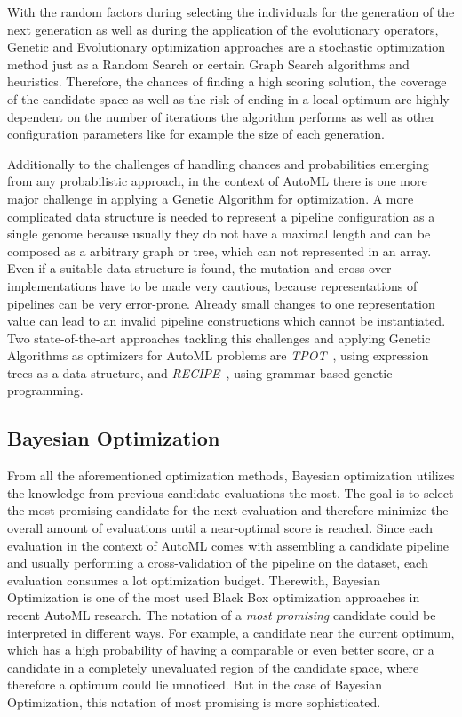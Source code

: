With the random factors during selecting the individuals for the generation of the next generation as well as during the application of the evolutionary operators, Genetic and Evolutionary optimization approaches are a stochastic optimization method just as a Random Search or certain Graph Search algorithms and heuristics.
Therefore, the chances of finding a high scoring solution, the coverage of the candidate space as well as the risk of ending in a local optimum are highly dependent on the number of iterations the algorithm performs as well as other configuration parameters like for example the size of each generation.

Additionally to the challenges of handling chances and probabilities emerging from any probabilistic approach, in the context of AutoML there is one more major challenge in applying a Genetic Algorithm for optimization.
A more complicated data structure is needed to represent a pipeline configuration as a single genome because usually they do not have a maximal length and can be composed as a arbitrary graph or tree, which can not represented in an array.
Even if a suitable data structure is found, the mutation and cross-over implementations have to be made very cautious, because representations of pipelines can be very error-prone.
Already small changes to one representation value can lead to an invalid pipeline constructions which cannot be instantiated.\newline
Two state-of-the-art approaches tackling this challenges and applying Genetic Algorithms as optimizers for AutoML problems are \textit{TPOT}~\cite{Olson-Tpot}, using expression trees as a data structure, and \textit{RECIPE}~\cite{Guimar-Recipe}, using grammar-based genetic programming.

\subsection{Bayesian Optimization}
\label{sec:theory:optimization:bayesian}
From all the aforementioned optimization methods, Bayesian optimization utilizes the knowledge from previous candidate evaluations the most.
The goal is to select the most promising candidate for the next evaluation and therefore minimize the overall amount of evaluations until a near-optimal score is reached.
Since each evaluation in the context of AutoML comes with assembling a candidate pipeline and usually performing a cross-validation of the pipeline on the dataset, each evaluation consumes a lot optimization budget.
Therewith, Bayesian Optimization is one of the most used Black Box optimization approaches in recent AutoML research.\newline
The notation of a \textit{most promising} candidate could be interpreted in different ways.
For example, a candidate near the current optimum, which has a high probability of having a comparable or even better score, or a candidate in a completely unevaluated region of the candidate space, where therefore a optimum could lie unnoticed.
But in the case of Bayesian Optimization, this notation of most promising is more sophisticated.

